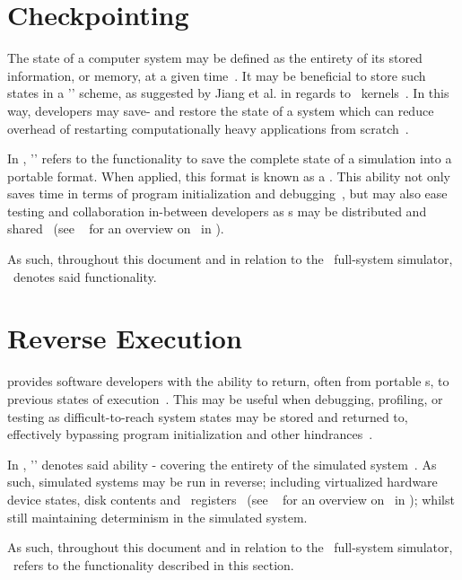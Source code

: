 \section{Checkpointing}
\label{sec:simics_checkpointing}
The state of a computer system may be defined as the entirety of its stored information, or memory, at a given time~.
It may be beneficial to store such states in a '\dvttermcheckpointrestart ' scheme, as suggested by Jiang et al. in regards to \dvttermcuda\ kernels~.
In this way, developers may save- and restore the state of a system which can reduce overhead of restarting computationally heavy applications from scratch~.

In \dvttermsimics , '\dvttermcheckpointing ' refers to the functionality to save the complete state of a simulation into a portable format.
When applied, this format is known as a \dvttermcheckpoint .
This ability not only  saves time in terms of program initialization and debugging~, but may also ease testing and collaboration in-between developers as \dvttermcheckpoint s may be distributed and shared~ (see ~ for an overview on \dvttermcheckpointing\ in \dvttermsimics ).

As such, throughout this document and in relation to the \dvttermsimics\ full-system simulator, \dvttermcheckpointing\ denotes said functionality.

\section{Reverse Execution}
\label{sec:simics_reverseexecution}
 provides software developers with the ability to return, often from portable \dvttermcheckpoint s, to previous states of execution~.
This may be useful when debugging, profiling, or testing as difficult-to-reach system states may be stored and returned to, effectively bypassing program initialization and other hindrances~.

In \dvttermsimics , '\dvttermreverseexecution ' denotes said ability - covering the entirety of the simulated system~.
As such, simulated systems may be run in reverse; including virtualized hardware device states, disk contents and \dvttermcpu\ registers~ (see ~ for an overview on \dvttermreverseexecution\ in \dvttermsimics ); whilst still maintaining determinism in the simulated system.

As such, throughout this document and in relation to the \dvttermsimics\ full-system simulator, \dvttermreverseexecution\ refers to the functionality described in this section.
